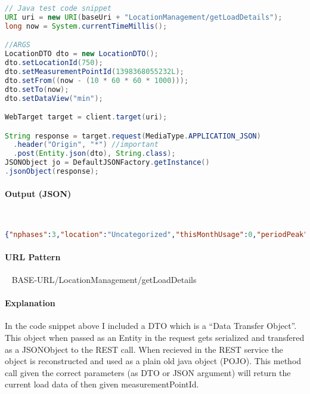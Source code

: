 \documentclass[
10pt, %
letterpaper, %
oneside, %
headinclude,footinclude, %
BCOR5mm, %
]{scrartcl}
\begin{document}
\begin{lstlisting}[language=Java]
// Java test code snippet
URI uri = new URI(baseUri + "LocationManagement/getLoadDetails");
long now = System.currentTimeMillis();

//ARGS
LocationDTO dto = new LocationDTO();
dto.setLocationId(750);
dto.setMeasurementPointId(1398368055232L);
dto.setFrom((now - (10 * 60 * 60 * 1000)));
dto.setTo(now);
dto.setDataView("min");

WebTarget target = client.target(uri);

String response = target.request(MediaType.APPLICATION_JSON)
  .header("Origin", "*") //important
  .post(Entity.json(dto), String.class);
JSONObject jo = DefaultJSONFactory.getInstance()
.jsonObject(response);
\end{lstlisting}

\paragraph{Output (JSON)} ~
\begin{lstlisting}[language=json]
{"nphases":3,"location":"Uncategorized","thisMonthUsage":0,"periodPeak":"746","hasBreaker":true,"peakCapacity":"0","endUse":"HVAC/Kitchen Hood Fan","periodTotal":"7437","electrical":"Panel KPL1 & 2 (208)/1 KHEF1","energyMates":[{"mac":"0x1240003BF/C"},{"mac":"0x1240003BF/B"},{"mac":"0x1240003BF/A"}],"ytdUsage":0,"name":"KHEF1","loadBalance":[1.682885348905083E11,1.7608065969601843E11,2.1944963546792365E11],"breaker":"1","breakerCapacity":"15","peakCapacityTime":-1234,"breakerPanel":"Panel KPL1 & 2 (208)"}
\end{lstlisting}

\paragraph{URL Pattern} 
~\newline
BASE-URL/LocationManagement/getLoadDetails

\paragraph{Explanation} In the code snippet above I included a DTO which is a ``Data Transfer Object''. This object when passed as an Entity in the request gets serialized and transfered as a JSONObject to the REST call. When recieved in the REST service the object is reconstructed and used as a plain old java object (POJO). This method call given the correct parameters (as DTO or JSON argument) will return the current load data of then given measurementPointId.
\end{document}
